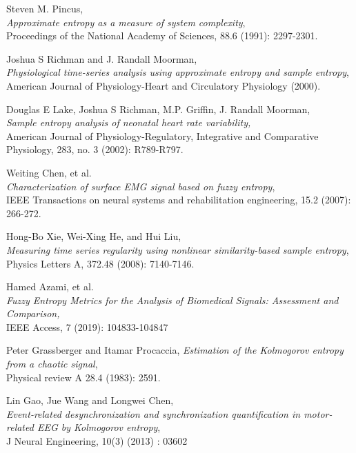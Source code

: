 \documentclass[12pt, a4paper, titlepage, openany]{book}
\newcommand\chapterimage[2][]{%
  \AddToShipoutPictureBG*{%
    \AtTextUpperLeft{%
     \hspace*{\textwidth}%
      \llap{%
            \texttt{[image: \#2]}}}}}%
\begin{document}
\renewcommand\bibname{\textbf{References}}
\begin{thebibliography}{9} 
\chapterimage[width=16cm, height=3cm]{Chapter Banner2.png}

\footnotesize
{} 
Steven M. Pincus, \\
\emph{Approximate entropy as a measure of system complexity},\\
Proceedings of the National Academy of Sciences,  88.6 (1991): 2297-2301.

Joshua S Richman and J. Randall Moorman, \\
\emph{Physiological time-series analysis using approximate entropy and sample entropy},\\
American Journal of Physiology-Heart and Circulatory Physiology (2000).

Douglas E Lake, Joshua S Richman, M.P. Griffin, J. Randall Moorman,\\
\emph{Sample entropy analysis of neonatal heart rate variability,}\\
American Journal of Physiology-Regulatory, Integrative and Comparative Physiology, 283, no. 3 (2002): R789-R797.

Weiting Chen, et al.\\
\emph{Characterization of surface EMG signal based on fuzzy entropy},\\
IEEE Transactions on neural systems and rehabilitation engineering, 15.2 (2007): 266-272.

Hong-Bo Xie, Wei-Xing He, and Hui Liu,\\
\emph{Measuring time series regularity using nonlinear similarity-based sample entropy},\\
Physics Letters A, 372.48 (2008): 7140-7146.

Hamed Azami, et al.\\
\emph{Fuzzy Entropy Metrics for the Analysis of Biomedical Signals: Assessment and Comparison,}\\
IEEE Access, 7 (2019): 104833-104847

Peter Grassberger and Itamar Procaccia,
\emph{Estimation of the Kolmogorov entropy from a chaotic signal},\\
Physical review A 28.4 (1983): 2591.
 
Lin Gao, Jue Wang  and Longwei Chen,\\
\emph{Event-related desynchronization and synchronization quantification in motor-related EEG by Kolmogorov entropy},\\
J Neural Engineering, 10(3) (2013) : 03602


\end{thebibliography}
\end{document}
